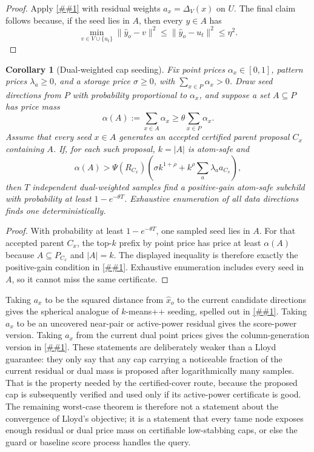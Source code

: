 \documentclass[10pt]{article}
\newcommand{\cref}[1]{\ref{##1}}
\newtheorem{corollary}[theorem]{Corollary}
\theoremstyle{definition}
\begin{document}
\begin{proof}
   Apply \cref{lem:residual-cap-seeding} with residual weights
   $a_x=\Delta_V(x)$ on $U$.  The final claim follows because, if the seed
   lies in $A$, then every $y\in A$ has
   \[
      \min_{v\in V\cup\{u_t\}}\|\widehat y_o-v\|^2
      \le
      \|\widehat y_o-u_t\|^2
      \le \eta^2 .
   \]
\end{proof}

\begin{corollary}[Dual-weighted cap seeding]\label{cor:dual-weighted-cap-seeding}
   Fix point prices $\alpha_x\in[0,1]$, pattern prices $\lambda_a\ge0$, and a
   storage price $\sigma\ge0$, with $\sum_{x\in P}\alpha_x>0$.  Draw seed
   directions from $P$ with probability proportional to $\alpha_x$, and suppose
   a set $A\subseteq P$ has price mass
   \[
      \alpha(A):=\sum_{x\in A}\alpha_x
      \ge \theta\sum_{x\in P}\alpha_x .
   \]
   Assume that every seed $x\in A$ generates an accepted certified parent
   proposal $C_x$ containing $A$.  If, for each such proposal, $k=|A|$ is
   atom-safe and
   \[
      \alpha(A)>
      \Psi(R_{C_x})
      \left(
         \sigma k^{1+\rho}
         +
         k^\rho\sum_a\lambda_a a_{C_x}
      \right),
   \]
   then $T$ independent dual-weighted samples find a positive-gain atom-safe
   subchild with probability at least $1-e^{-\theta T}$.  Exhaustive
   enumeration of all data directions finds one deterministically.
\end{corollary}

\begin{proof}
   With probability at least $1-e^{-\theta T}$, one sampled seed lies in $A$.
   For that accepted parent $C_x$, the top-$k$ prefix by point price has price
   at least $\alpha(A)$ because $A\subseteq P_{C_x}$ and $|A|=k$.  The displayed
   inequality is therefore exactly the positive-gain condition in
   \cref{cor:price-density-subchild}.  Exhaustive enumeration includes every
   seed in $A$, so it cannot miss the same certificate.
\end{proof}

Taking $a_x$ to be the squared distance from $\widehat x_o$ to the current
candidate directions gives the spherical analogue of $k$-means++ seeding,
spelled out in \cref{cor:spherical-d2-seeding}.
Taking $a_x$ to be an uncovered near-pair or active-power residual gives the
score-power version.  Taking $a_x$ from the current dual point prices gives the
column-generation version in \cref{cor:dual-weighted-cap-seeding}.  These
statements are deliberately weaker than a Lloyd guarantee: they only say that
any cap carrying a noticeable fraction of the current residual or dual mass is
proposed after logarithmically many samples.  That is the property needed by the
certified-cover route, because the proposed cap is subsequently verified and
used only if its active-power certificate is good.  The remaining worst-case
theorem is therefore not a statement about the convergence of Lloyd's objective;
it is a statement that every tame node exposes enough residual or dual price
mass on certifiable low-stabbing caps, or else the guard or baseline score
process handles the query.
\end{document}
